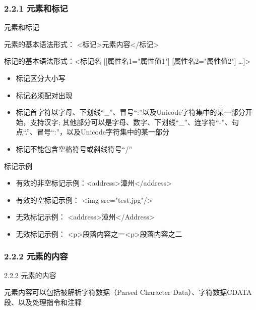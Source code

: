 \subsubsection{2.2.1 元素和标记}
\begin{frame}{元素和标记}
\begin{shaded}
\par 元素的基本语法形式： <标记>元素内容</标记>
\par 标记的基本语法形式：<标记名 [[属性名1="属性值1"] [属性名2="属性值2"] …]>
\end{shaded}
\begin{itemize}
    \item 标记区分大小写
    \item  标记必须配对出现
    \item 标记首字符以字母、下划线“\_”、冒号“:”以及Unicode字符集中的某一部分开始，支持汉字; 其他部分可以是字母、数字、下划线“\_”、连字符“-”、句点“.”、冒号“:”，以及Unicode字符集中的某一部分
    \item 标记不能包含空格符号或斜线符号“/”
\end{itemize}
\end{frame}


\begin{frame}{标记示例}
\begin{itemize}
    \item 有效的非空标记示例：<address>漳州</address>
    \item 有效的空标记示例：  <img src="test.jpg"/>
    \item 无效标记示例：      <address>漳州</Address>
    \item 无效标记示例：      <p>段落内容之一<p>段落内容之二
\end{itemize}
\end{frame}


\subsubsection{2.2.2  元素的内容}
\begin{frame}{2.2.2  元素的内容}
\par 元素内容可以包括被解析字符数据（Parsed Character Data）、字符数据CDATA段、以及处理指令和注释
\end{frame}


